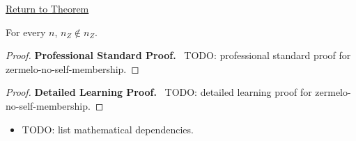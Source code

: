 \newpage
{}
\label{prf:zermelo-no-self-membership}

\begin{remark*}[Return]
\hyperref[cor:zermelo-no-self-membership]{Return to Theorem}
\end{remark*}

\begin{theorem*}
For every $n$, $n_Z \notin n_Z$.
\end{theorem*}

\begin{proof}
\textbf{Professional Standard Proof.}~
TODO: professional standard proof for zermelo-no-self-membership.
\end{proof}

\begin{proof}
\textbf{Detailed Learning Proof.}~
TODO: detailed learning proof for zermelo-no-self-membership.
\end{proof}

\begin{remark*}
\end{remark*}

\begin{dependencies}
\begin{itemize}
  \item TODO: list mathematical dependencies.
\end{itemize}
\end{dependencies}

\clearpage
